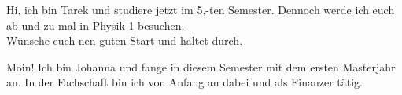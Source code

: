 \begin{multicols*}{2}
\columnbreak

{Hi,
	ich bin Tarek und studiere jetzt im 5,-ten Semester. Dennoch werde ich euch ab und zu mal in Physik 1 besuchen. \\
	Wünsche euch nen guten Start und haltet durch.}


{Moin! Ich bin Johanna und fange in diesem Semester mit dem ersten Masterjahr an. In der Fachschaft bin ich von Anfang an dabei und als Finanzer tätig.
}
	

\end{multicols*}
